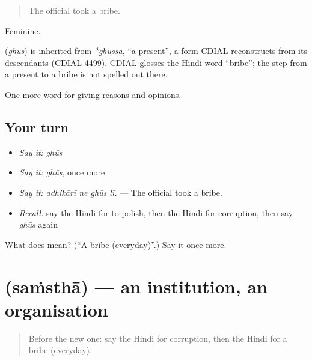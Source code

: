 \begin{quote}
The official took a bribe.
\end{quote}

Feminine.

\begin{cousinweb}
\textbf{} (\emph{ghūs}) is inherited from \emph{*ghūssā}, \textquotedblleft{}a present\textquotedblright{}, a form CDIAL reconstructs from its descendants (CDIAL 4499). CDIAL glosses the Hindi word \textquotedblleft{}bribe\textquotedblright{}; the step from a present to a bribe is not spelled out there.
\end{cousinweb}

\begin{grammarlens}[title={What you've built}]
One more word for giving reasons and opinions.
\end{grammarlens}

\subsection*{Your turn}
\begin{itemize}
\raggedright
  \item \emph{Say it:} \emph{ghūs}
  \item \emph{Say it:} \emph{ghūs}, once more
  \item \emph{Say it:} \emph{adhikārī ne ghūs lī.} — The official took a bribe.
  \item \emph{Recall:} say the Hindi for to polish, then the Hindi for corruption, then say \emph{ghūs} again
\end{itemize}

\begin{tcolorbox}[breakable,colback=teal!4,colframe=teal!35!black,title={Before you move on}]
What does  mean? (\textquotedblleft{}A bribe (everyday)\textquotedblright{}.) Say it once more.
\end{tcolorbox}
\section[\texorpdfstring{\hi{संस्था} (saṁsthā)}{संस्था (saṁsthā)}]{ (saṁsthā) — an institution, an organisation}

\label{lesson:HI-C369-samstha}



\begin{quote}
Before the new one: say the Hindi for corruption, then the Hindi for a bribe (everyday).
\end{quote}

